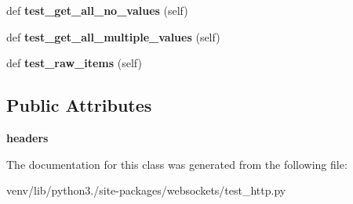 \begin{DoxyCompactItemize}
def {\bfseries test\+\_\+get\+\_\+all\+\_\+no\+\_\+values} (self)
\item 
\mbox{\label{classwebsockets_1_1test__http_1_1_headers_tests_ac171fe07ed875b4848ad4a103104ccf8}} 
def {\bfseries test\+\_\+get\+\_\+all\+\_\+multiple\+\_\+values} (self)
\item 
\mbox{\label{classwebsockets_1_1test__http_1_1_headers_tests_ac1a424acfaf299ed5a530cda46034fd9}} 
def {\bfseries test\+\_\+raw\+\_\+items} (self)
\end{DoxyCompactItemize}
\subsection*{Public Attributes}
\begin{DoxyCompactItemize}
\item 
\mbox{\label{classwebsockets_1_1test__http_1_1_headers_tests_ae97a9484dc206e98089e8b5362136260}} 
{\bfseries headers}
\end{DoxyCompactItemize}


The documentation for this class was generated from the following file\+:\begin{DoxyCompactItemize}
\item 
venv/lib/python3./site-\/packages/websockets/test\+\_\+http.\+py\end{DoxyCompactItemize}
